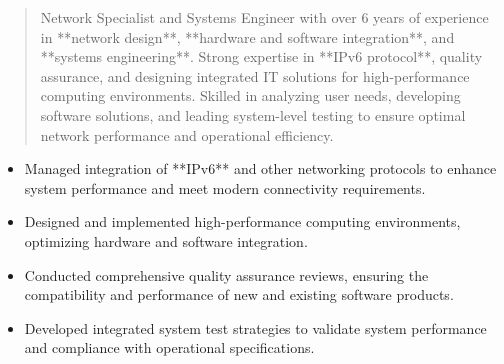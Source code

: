 




\makecvheader

\begin{quote}
  \noindent
  Network Specialist and Systems Engineer with over 6 years of experience in **network design**, **hardware and software integration**, and **systems engineering**. Strong expertise in **IPv6 protocol**, quality assurance, and designing integrated IT solutions for high-performance computing environments. Skilled in analyzing user needs, developing software solutions, and leading system-level testing to ensure optimal network performance and operational efficiency.
\end{quote}

\par\smallskip
\noindent
\begin{minipage}{20cm}
  \begin{minipage}{9.75cm}
    \begin{itemize}
      \item Managed integration of **IPv6** and other networking protocols to enhance system performance and meet modern connectivity requirements.
      \item Designed and implemented high-performance computing environments, optimizing hardware and software integration.
    \end{itemize}
  \end{minipage}
  \hfill
  \begin{minipage}{9.75cm}
    \begin{itemize}
      \item Conducted comprehensive quality assurance reviews, ensuring the compatibility and performance of new and existing software products.
      \item Developed integrated system test strategies to validate system performance and compliance with operational specifications.
    \end{itemize}
  \end{minipage}
\end{minipage}
\par\smallskip
\divider


